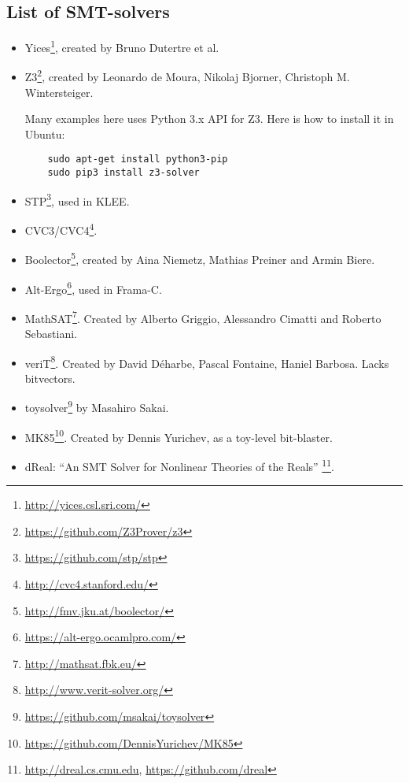 \subsection{List of SMT-solvers}

\begin{itemize}

\item Yices\footnote{\url{http://yices.csl.sri.com/}}, created by Bruno Dutertre et al.

\item Z3\footnote{\url{https://github.com/Z3Prover/z3}},
created by Leonardo de Moura, Nikolaj Bjorner, Christoph M. Wintersteiger.

	Many examples here uses Python 3.x API for Z3.
	Here is how to install it in Ubuntu:

	\begin{lstlisting}
	sudo apt-get install python3-pip
	sudo pip3 install z3-solver
	\end{lstlisting}

\item STP\footnote{\url{https://github.com/stp/stp}}, used in KLEE.

\item CVC3/CVC4\footnote{\url{http://cvc4.stanford.edu/}}.

\item Boolector\footnote{\url{http://fmv.jku.at/boolector/}}, created by Aina Niemetz, Mathias Preiner and Armin Biere.

\item Alt-Ergo\footnote{\url{https://alt-ergo.ocamlpro.com/}}, used in Frama-C.

\item MathSAT\footnote{\url{http://mathsat.fbk.eu/}}. Created by Alberto Griggio, Alessandro Cimatti and Roberto Sebastiani.

\item veriT\footnote{\url{http://www.verit-solver.org/}}.
Created by David Déharbe, Pascal Fontaine, Haniel Barbosa.
Lacks bitvectors.

\item toysolver\footnote{\url{https://github.com/msakai/toysolver}} by Masahiro Sakai.

\item MK85\footnote{\url{https://github.com/DennisYurichev/MK85}}. Created by Dennis Yurichev, as a toy-level bit-blaster.

\item dReal: ``An SMT Solver for Nonlinear Theories of the Reals''
\footnote{\url{http://dreal.cs.cmu.edu}, \url{https://github.com/dreal}}.

\end{itemize}

